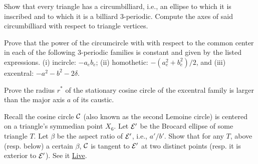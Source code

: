 \begin{exercise}
\label{ex:03-circumbilliard} 
Show that every triangle has a circumbilliard, i.e., an ellipse to which it is inscribed and to which it is a billiard 3-periodic. Compute the axes of said circumbilliard with respect to triangle vertices. 
\end{exercise}
 
\begin{exercise}
 \label{ex:03-power-euler} 
Prove that the power of the circumcircle with with respect to the common center in each of the following 3-periodic families is constant and given by the listed expressions. (i) incircle: $-a_e b_e$; (ii) homothetic: $-({a_e^2+b_e^2})/{2}$, and (iii) excentral: $-a^2-b^2-2\delta$. 
\end{exercise}



\begin{exercise}
\label{ex:03-cosine-circle}
Prove the radius $r^*$ of the stationary cosine circle of the excentral family is larger than the major axis $a$ of its caustic. 
\end{exercise}

\begin{exercise}
Recall the cosine circle $\mathcal{C}$ (also known as the second Lemoine circle) is centered on a triangle's symmedian point $X_6$. Let $\mathcal{E}'$ be the Brocard ellipse of some triangle $T$. Let $\beta$ be the aspect ratio of $\mathcal{E}'$, i.e., $a'/b'$. Show that for any $T$, above (resp. below) a certain $\beta$, $\mathcal{C}$ is tangent to $\mathcal{E}'$ at two distinct points (resp. it is exterior to $\mathcal{E}'$). See it \href{https://bit.ly/2RqhUQV}{Live}.
\end{exercise}

